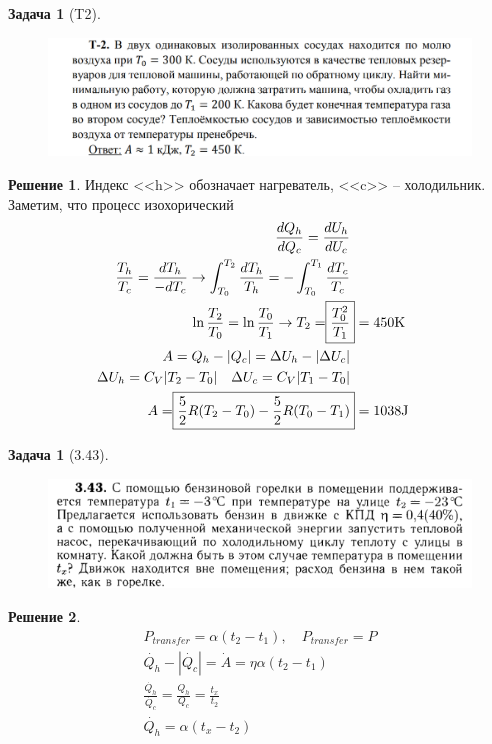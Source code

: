 \documentclass[a4paper,12pt]{article}
\newtheorem{problem}[]{Задача}
\theoremstyle{definition}
\newtheorem*{solution}{Решение}
\begin{document}
        \begin{problem}[T2]
            \begin{figure}
                \centering
                \includegraphics*[width=1\linewidth]{img/t2.png}
            \end{figure}
        \end{problem}
        \begin{solution}
            Индекс <<h>> обозначает нагреватель, <<c>> -- холодильник. Заметим, что процесс изохорический
            \begin{align*}
                \frac{dQ_h}{dQ_c}=\frac{dU_h}{dU_c}&\\ 
                \frac{T_h}{T_c}=\frac{dT_h}{-dT_c} \rightarrow \int_{T_0}^{T_2}\frac{dT_h}{T_h}=-\int_{T_0}^{T_1}\frac{dT_c}{T_c}&\\
                \ln \frac{T_2}{T_0}=\ln\frac{T_0}{T_1}\rightarrow T_2=\Aboxed{\frac{T_0^2}{T_1}}=450 \text{K}&\\
                A=Q_h-|Q_c|=\Delta U_h-|\Delta U_c|&\\
                \Delta U_h=C_V |T_2-T_0| \quad \Delta U_c=C_V|T_1-T_0|&\\
                A=\Aboxed{\frac{5}{2}R(T_2-T_0)-\frac{5}{2}R(T_0-T_1)}=1038 \text{J}
            \end{align*}
        \end{solution}

        \begin{problem}[3.43]
            \begin{figure}[H]
                \centering
                \includegraphics*[width=1\linewidth]{img/3.43.png}
            \end{figure}
        \end{problem}
        \begin{solution}
            \begin{align*}
                P_{transfer}=\alpha(t_2-t_1), \quad P_{transfer}=P\\ 
                \dot{Q_h}-|\dot{Q_c}|=\dot{A}=\eta\alpha(t_2-t_1)\\
                \frac{\dot{Q_h}}{\dot{Q_c}}=\frac{Q_h}{Q_c}=\frac{t_x}{t_2}\\
                \dot{Q_h}=\alpha(t_x-t_2)
            \end{align*}
        \end{solution}
\end{document}
